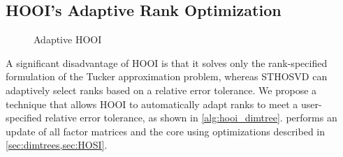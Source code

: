 \subsection{HOOI's Adaptive Rank Optimization} \label{HOOI's Adaptive Rank Optimization}

    \begin{figure}
        \centering
        
        \caption{Adaptive HOOI}
        \label{fig:adaptive_hooi}
    \end{figure}

    A significant disadvantage of HOOI is that it solves only the rank-specified
    formulation of the Tucker approximation problem, whereas STHOSVD can
    adaptively select ranks based on a relative error tolerance. We propose a
    technique that allows HOOI to automatically adapt ranks to meet a
    user-specified relative error tolerance, as shown in
    \cref{alg:hooi_dimtree}.  performs an update of all
    factor matrices and the core using optimizations described in
    \cref{sec:dimtrees,sec:HOSI}.

